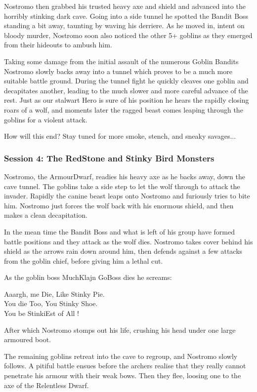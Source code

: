 Nostromo then grabbed his trusted heavy axe and shield and advanced into the horribly stinking dark cave. Going into a side tunnel he spotted the Bandit Boss standing a bit away, taunting by waving his derriere. As he moved in, intent on bloody murder, Nostromo soon also noticed the other 5+ goblins as they emerged from their hideouts to ambush him.

Taking some damage from the initial assault of the numerous Goblin Bandits Nostromo slowly backs away into a tunnel which proves to be a much more suitable battle ground. During the tunnel fight he quickly cleaves one goblin and decapitates another, leading to the much slower and more careful advance of the rest. Just as our stalwart Hero is sure of his position he hears the rapidly closing roars of a wolf, and moments later the ragged beast comes leaping through the goblins for a violent attack.

How will this end? Stay tuned for more smoke, stench, and sneaky savages...


\subsubsection*{Session 4: The RedStone and Stinky Bird Monsters}
Nostromo, the ArmourDwarf, readies his heavy axe as he backs away, down the cave tunnel. The goblins take a side step to let the wolf through to attack the invader. Rapidly the canine beast leaps onto Nostromo and furiously tries to bite him. Nostromo just forces the wolf back with his enormous shield, and then makes a clean decapitation.

In the mean time the Bandit Boss and what is left of his group have formed battle positions and they attack as the wolf dies. Nostromo takes cover behind his shield as the arrows rain down around him, then defends against a few attacks from the goblin chief, before giving him a lethal cut.

As the goblin boss MuchKlajn GoBoss dies he screams:
\begin{readoutloud}
Aaargh, me Die, Like Stinky Pie.\\
You die Too, You Stinky Shoe.\\
You be StinkiEst of All !
\end{readoutloud}
After which Nostromo stomps out his life, crushing his head under one large armoured boot.

The remaining goblins retreat into the cave to regroup, and Nostromo slowly follows. A pitiful battle ensues before the archers realise that they really cannot penetrate his armour with their weak bows. Then they flee, loosing one to the axe of the Relentless Dwarf.

